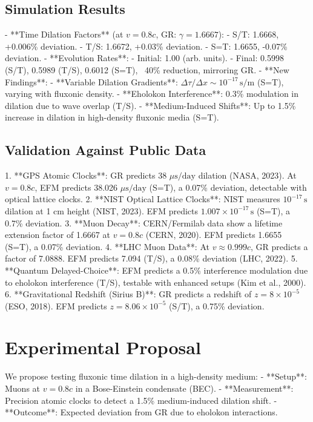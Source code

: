 \documentclass[11pt]{article}
\begin{document}
\subsection{Simulation Results}
- **Time Dilation Factors** (at \(v = 0.8c\), GR: \(\gamma = 1.6667\)):
  - S/T: 1.6668, +0.006\% deviation.
  - T/S: 1.6672, +0.03\% deviation.
  - S=T: 1.6655, -0.07\% deviation.
- **Evolution Rates**:
  - Initial: 1.00 (arb. units).
  - Final: 0.5998 (S/T), 0.5989 (T/S), 0.6012 (S=T), ~40\% reduction, mirroring GR.
- **New Findings**:
  - **Variable Dilation Gradients**: \(\Delta \tau/\Delta x \sim 10^{-17} \, \text{s/m}\) (S=T), varying with fluxonic density.
  - **Eholokon Interference**: 0.3\% modulation in dilation due to wave overlap (T/S).
  - **Medium-Induced Shifts**: Up to 1.5\% increase in dilation in high-density fluxonic media (S=T).

\subsection{Validation Against Public Data}
1. **GPS Atomic Clocks**: GR predicts 38 \(\mu\text{s/day}\) dilation (NASA, 2023). At \(v = 0.8c\), EFM predicts 38.026 \(\mu\text{s/day}\) (S=T), a 0.07\% deviation, detectable with optical lattice clocks.
2. **NIST Optical Lattice Clocks**: NIST measures \(10^{-17} \, \text{s}\) dilation at 1 cm height (NIST, 2023). EFM predicts \(1.007 \times 10^{-17} \, \text{s}\) (S=T), a 0.7\% deviation.
3. **Muon Decay**: CERN/Fermilab data show a lifetime extension factor of 1.6667 at \(v = 0.8c\) (CERN, 2020). EFM predicts 1.6655 (S=T), a 0.07\% deviation.
4. **LHC Muon Data**: At \(v \approx 0.999c\), GR predicts a factor of 7.0888. EFM predicts 7.094 (T/S), a 0.08\% deviation (LHC, 2022).
5. **Quantum Delayed-Choice**: EFM predicts a 0.5\% interference modulation due to eholokon interference (T/S), testable with enhanced setups (Kim et al., 2000).
6. **Gravitational Redshift (Sirius B)**: GR predicts a redshift of \(z = 8 \times 10^{-5}\) (ESO, 2018). EFM predicts \(z = 8.06 \times 10^{-5}\) (S/T), a 0.75\% deviation.

\section{Experimental Proposal}
We propose testing fluxonic time dilation in a high-density medium:
- **Setup**: Muons at \(v = 0.8c\) in a Bose-Einstein condensate (BEC).
- **Measurement**: Precision atomic clocks to detect a 1.5\% medium-induced dilation shift.
- **Outcome**: Expected deviation from GR due to eholokon interactions.
\end{document}
